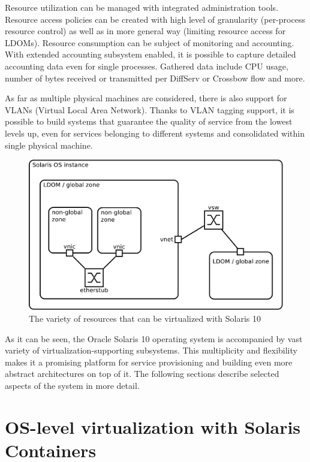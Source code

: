 \documentclass[11pt]{book}
\begin{document}
      Resource utilization can be managed with integrated administration tools. Resource access policies can be created
      with high level of granularity (per-process resource control) as well as in more general way (limiting resource
      access for LDOMs). Resource consumption can be subject of monitoring and accounting. With extended accounting
      subsystem enabled, it is possible to capture detailed accounting data even for single processes. Gathered data
      include CPU usage, number of bytes received or transmitted per DiffServ or Crossbow flow and more.

      As far as multiple physical machines are considered, there is also support for VLANs (Virtual Local Area Network).
      Thanks to VLAN tagging support, it is possible to build systems that guarantee the quality of service from the
      lowest levels up, even for services belonging to different systems and consolidated within single physical machine.

      \begin{figure}[H]
        \begin{center}
          \includegraphics[width=.7\textwidth]{img/solaris/full-featured.pdf}
        \end{center}

        \caption{The variety of resources that can be virtualized with Solaris 10}
      \end{figure}

      As it can be seen, the Oracle Solaris 10 operating system is accompanied by vast variety
      of virtualization-supporting subsystems. This multiplicity and flexibility makes it a promising
      platform for service provisioning and building even more abstract architectures on top of it. The following
      sections describe selected aspects of the system in more detail.


    \section{OS-level virtualization with Solaris Containers}
    \label{sec:sol:containers}
\end{document}
